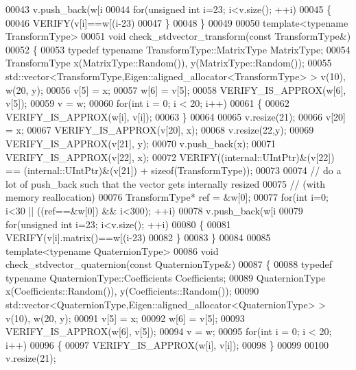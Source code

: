 \begin{DoxyCode}
00043     v.push\_back(w[i%
00044   \textcolor{keywordflow}{for}(\textcolor{keywordtype}{unsigned} \textcolor{keywordtype}{int} i=23; i<v.size(); ++i)
00045   \{
00046     VERIFY(v[i]==w[(i-23)%
00047   \}
00048 \}
00049 
00050 \textcolor{keyword}{template}<\textcolor{keyword}{typename} TransformType>
00051 \textcolor{keywordtype}{void} check\_stdvector\_transform(\textcolor{keyword}{const} TransformType&)
00052 \{
00053   \textcolor{keyword}{typedef} \textcolor{keyword}{typename} TransformType::MatrixType MatrixType;
00054   TransformType x(MatrixType::Random()), y(MatrixType::Random());
00055   std::vector<TransformType,Eigen::aligned\_allocator<TransformType> > v(10), w(20, y);
00056   v[5] = x;
00057   w[6] = v[5];
00058   VERIFY\_IS\_APPROX(w[6], v[5]);
00059   v = w;
00060   \textcolor{keywordflow}{for}(\textcolor{keywordtype}{int} i = 0; i < 20; i++)
00061   \{
00062     VERIFY\_IS\_APPROX(w[i], v[i]);
00063   \}
00064 
00065   v.resize(21);
00066   v[20] = x;
00067   VERIFY\_IS\_APPROX(v[20], x);
00068   v.resize(22,y);
00069   VERIFY\_IS\_APPROX(v[21], y);
00070   v.push\_back(x);
00071   VERIFY\_IS\_APPROX(v[22], x);
00072   VERIFY((internal::UIntPtr)&(v[22]) == (internal::UIntPtr)&(v[21]) + \textcolor{keyword}{sizeof}(TransformType));
00073 
00074   \textcolor{comment}{// do a lot of push\_back such that the vector gets internally resized}
00075   \textcolor{comment}{// (with memory reallocation)}
00076   TransformType* ref = &w[0];
00077   \textcolor{keywordflow}{for}(\textcolor{keywordtype}{int} i=0; i<30 || ((ref==&w[0]) && i<300); ++i)
00078     v.push\_back(w[i%
00079   \textcolor{keywordflow}{for}(\textcolor{keywordtype}{unsigned} \textcolor{keywordtype}{int} i=23; i<v.size(); ++i)
00080   \{
00081     VERIFY(v[i].matrix()==w[(i-23)%
00082   \}
00083 \}
00084 
00085 \textcolor{keyword}{template}<\textcolor{keyword}{typename} QuaternionType>
00086 \textcolor{keywordtype}{void} check\_stdvector\_quaternion(\textcolor{keyword}{const} QuaternionType&)
00087 \{
00088   \textcolor{keyword}{typedef} \textcolor{keyword}{typename} QuaternionType::Coefficients Coefficients;
00089   QuaternionType x(Coefficients::Random()), y(Coefficients::Random());
00090   std::vector<QuaternionType,Eigen::aligned\_allocator<QuaternionType> > v(10), w(20, y);
00091   v[5] = x;
00092   w[6] = v[5];
00093   VERIFY\_IS\_APPROX(w[6], v[5]);
00094   v = w;
00095   \textcolor{keywordflow}{for}(\textcolor{keywordtype}{int} i = 0; i < 20; i++)
00096   \{
00097     VERIFY\_IS\_APPROX(w[i], v[i]);
00098   \}
00099 
00100   v.resize(21);

\end{DoxyCode}

